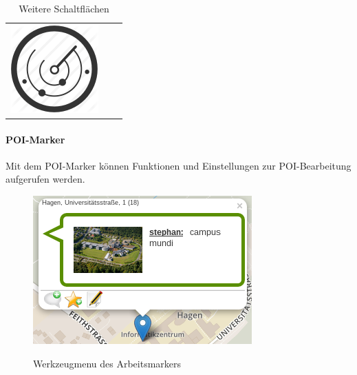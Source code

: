 \begin{table}[H]
\begin{tabulary}{\columnwidth}{ C C C }
	\includegraphics[scale=0.15]{bilder/icons/radar.png} \\
  \end{tabulary}
  \caption{Weitere Schaltflächen}
\end{table}

\enlargethispage{2\baselineskip} %
\paragraph{POI-Marker}
Mit dem POI-Marker können Funktionen und Einstellungen zur POI-Bearbeitung aufgerufen werden.

  \begin{figure}[H]
      \centering
	  \includegraphics[scale=0.8]{bilder/screenshots/menu_poimarker.png}\\ 
  	  \caption{Werkzeugmenu des Arbeitsmarkers}
  \end{figure}

